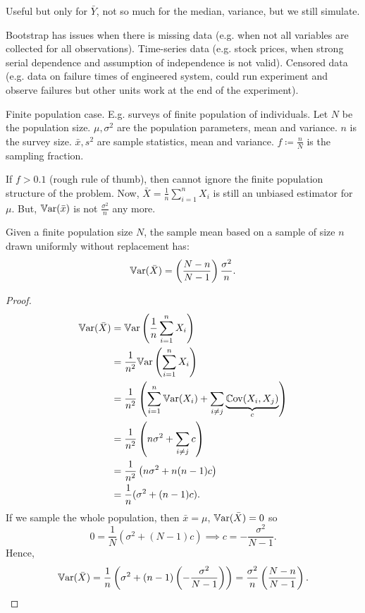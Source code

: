 \documentclass[10pt, a4paper]{article}
\begin{document}
Useful but only for $\bar{Y}$,
not so much for the median,
variance,
but we still simulate.

Bootstrap has issues when there is missing data
(e.g. when not all variables are collected for all observations).
Time-series data
(e.g. stock prices,
when strong serial dependence and assumption of independence is not valid).
Censored data
(e.g. data on failure times of engineered system,
could run experiment and observe failures but other units work at the end of the experiment).

Finite population case.
E.g. surveys of finite population of individuals.
Let $N$ be the population size.
$\mu, \sigma ^ 2$ are the population parameters,
mean and variance.
$n$ is the survey size.
$\bar{x}, s ^ 2$ are sample statistics,
mean and variance.
$f \coloneqq \frac{n}{N}$ is the sampling fraction.

If $f > 0.1$
(rough rule of thumb),
then cannot ignore the finite population structure of the problem.
Now,
$\bar{X} = \frac{1}{n}\sum_{i = 1}^{n}X_i$ is still an unbiased estimator for $\mu$.
But,
$\mathbb{V}\mathrm{ar}(\bar{x})$ is not $\frac{\sigma ^ 2}{n}$ any more.

\begin{theorem}
    Given a finite population size $N$,
    the sample mean based on a sample of size $n$ drawn uniformly without replacement has:
    \[
    \mathbb{V}\mathrm{ar}(\bar{X}) = \left(\frac{N - n}{N - 1}\right)\frac{\sigma ^ 2}{n}.
    \]

    \begin{proof}
        \begin{align*}
            \mathbb{V}\mathrm{ar}(\bar{X}) &= \mathbb{V}\mathrm{ar}\left(\frac{1}{n}\sum_{i = 1}^{n}X_i\right) \\
            &= \frac{1}{n ^ 2}\mathbb{V}\mathrm{ar}\left(\sum_{i = 1}^{n}X_i\right) \\
            &= \frac{1}{n ^ 2}\left(\sum_{i = 1}^{n}\mathbb{V}\mathrm{ar}(X_i) + \sum_{i \neq j}\underbrace{\mathbb{C}\mathrm{ov}(X_i, X_j)}_{c}\right) \\
            &= \frac{1}{n ^ 2}\left(n\sigma ^ 2 + \sum_{i \neq j}c\right) \\
            &= \frac{1}{n ^ 2}\left(n\sigma ^ 2 + n(n - 1)c\right) \\
            &= \frac{1}{n}(\sigma ^ 2 + (n - 1)c).
        \end{align*}
        If we sample the whole population,
        then $\bar{x} = \mu$,
        $\mathbb{V}\mathrm{ar}(\bar{X}) = 0$ so
        \[
        0 = \frac{1}{N}(\sigma ^ 2 + (N - 1)c) \implies c = -\frac{\sigma ^ 2}{N - 1}.
        \]
        Hence,
        \[
        \mathbb{V}\mathrm{ar}(\bar{X}) = \frac{1}{n}\left(\sigma ^2  + (n - 1)\left(-\frac{\sigma ^ 2}{N - 1}\right)\right) = \frac{\sigma ^ 2}{n}\left(\frac{N - n}{N - 1}\right).
        \]
    \end{proof}
\end{theorem}
\end{document}
